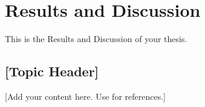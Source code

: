 \chapter{Results and Discussion}
\label{chap:resultsanddiscussion}

This is the Results and Discussion of your thesis.

\section{[Topic Header]}
[Add your content here. Use \cite{sample} for references.]

